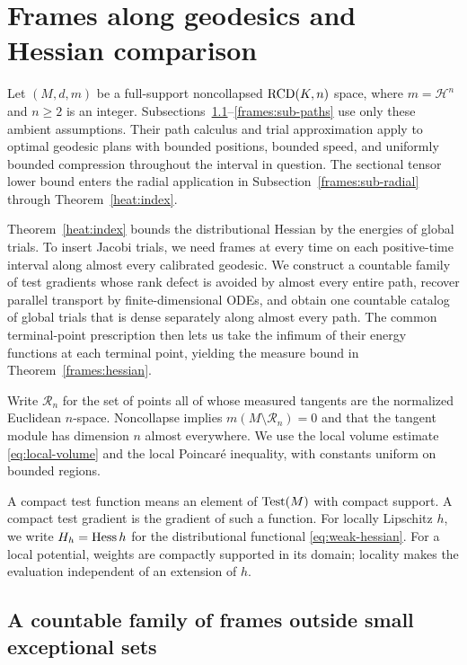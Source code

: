 \section{Frames along geodesics and Hessian comparison}\label{sec:frames}

Let $(M,d,m)$ be a full-support noncollapsed $\mathrm{RCD}(K,n)$ space,
where $m=\mathcal H^n$ and $n\geq2$ is an integer.
Subsections~\ref{frames:sub-countable}--\ref{frames:sub-paths} use only
these ambient assumptions.  Their path calculus and trial approximation
apply to optimal geodesic plans with bounded positions, bounded speed,
and uniformly bounded compression throughout the interval in question.
The sectional tensor lower bound enters the radial application in
Subsection~\ref{frames:sub-radial} through Theorem~\ref{heat:index}.

Theorem~\ref{heat:index} bounds the distributional Hessian by the
energies of global trials.  To insert Jacobi trials, we need frames at
every time on each positive-time interval along almost every calibrated
geodesic.  We construct a countable family of test gradients whose rank
defect is avoided by almost every entire path, recover parallel transport by
finite-dimensional ODEs, and obtain one countable catalog of global
trials that is dense separately along almost every path.  The common
terminal-point prescription then lets us take the infimum of their
energy functions at each terminal point, yielding the measure bound in
Theorem~\ref{frames:hessian}.

Write $\mathcal R_n$ for the set of points all of whose measured tangents
are the normalized Euclidean $n$-space.  Noncollapse implies
$m(M\setminus\mathcal R_n)=0$ and that the tangent module has dimension
$n$ almost everywhere.  We use the local volume estimate
\eqref{eq:local-volume} and the local Poincar\'e inequality, with
constants uniform on bounded regions.

A compact test function means an element of $\operatorname{Test}(M)$ with compact
support.  A compact test gradient is the gradient of such a function.
For locally Lipschitz $h$, we write $H_h=\operatorname{Hess} h$ for the
distributional functional \eqref{eq:weak-hessian}.  For a local
potential, weights are compactly supported in its domain; locality
makes the evaluation independent of an extension of $h$.

\subsection{A countable family of frames outside small exceptional sets}
\label{frames:sub-countable}

